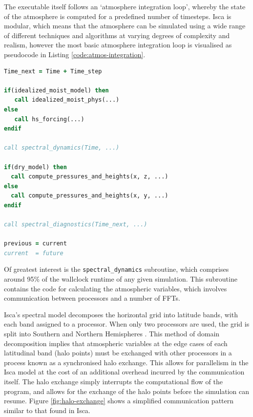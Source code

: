 \documentclass[a4paper,11pt]{report}
\begin{document}
\par
\par
The executable itself follows an `atmosphere integration loop', whereby the state of the atmosphere is computed for a predefined number of timesteps. Isca is modular, which means that the atmosphere can be simulated using a wide range of different techniques and algorithms at varying degrees of complexity and realism, however the most basic atmosphere integration loop is visualised as pseudocode in Listing \ref{code:atmos-integration}.

\begin{lstlisting}[language=Fortran,label={code:atmos-integration},caption={Pseudocode for the atmospheric integration loop found in Isca.}]
Time_next = Time + Time_step

if(idealized_moist_model) then
   call idealized_moist_phys(...)
else
   call hs_forcing(...)
endif

call spectral_dynamics(Time, ...)

if(dry_model) then
  call compute_pressures_and_heights(x, z, ...)
else
  call compute_pressures_and_heights(x, y, ...)
endif

call spectral_diagnostics(Time_next, ...)

previous = current
current  = future
\end{lstlisting}
\par
Of greatest interest is the \texttt{spectral\_dynamics} subroutine, which comprises around 95\% of the wallclock runtime of any given simulation. This subroutine contains the code for calculating the atmospheric variables, which involves  communication between processors and a number of FFTs. 
\par
Isca's spectral model decomposes the horizontal grid into latitude bands, with each band assigned to a processor. When only two processors are used, the grid is split into Southern and Northern Hemispheres \cite{isca2019github}. This method of domain decomposition implies that atmospheric variables at the edge cases of each latitudinal band (halo points) must be exchanged with other processors in a process known as a synchronised halo exchange. This allows for parallelism in the Isca model at the cost of an additional overhead incurred by the communication itself. The halo exchange simply interrupts the computational flow of the program, and allows for the exchange of the halo points before the simulation can resume. Figure \ref{fig:halo-exchange} shows a simplified communication pattern similar to that found in Isca. 
\end{document}
